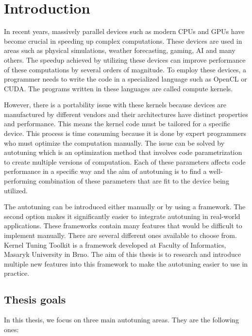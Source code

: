 \documentclass[
  digital,     %
  oneside,     %
  nosansbold,  %
  nocolorbold, %
  lof,         %
  lot,         %
  nocover
]{fithesis4}
\begin{document}
\chapter{Introduction}
In recent years, massively parallel devices such as modern CPUs and GPUs have become crucial in speeding up complex computations. These devices are used in areas such as physical simulations, weather forecasting, gaming, AI and many others. The speedup achieved by utilizing these devices can improve performance of these computations by several orders of magnitude. To employ these devices, a programmer needs to write the code in a specialized language such as OpenCL or CUDA. The programs written in these languages are called compute kernels.

However, there is a portability issue with these kernels because devices are manufactured by different vendors and their architectures have distinct properties and performance. This means the kernel code must be tailored for a specific device. This process is time consuming because it is done by expert programmers who must optimize the computation manually. The issue can be solved by autotuning \cite{balaprakash2018autotuning} which is an optimization method that involves code parametrization to create multiple versions of computation. Each of these parameters affects code performance in a specific way and the aim of autotuning is to find a well-performing combination of these parameters that are fit to the device being utilized.

The autotuning can be introduced either manually or by using a framework. The second option makes it significantly easier to integrate autotuning in real-world applications. These frameworks contain many features that would be difficult to implement manually. There are several different ones available to choose from. Kernel Tuning Toolkit is a framework developed at Faculty of Informatics, Masaryk University in Brno. The aim of this thesis is to research and introduce multiple new features into this framework to make the autotuning easier to use in practice.

\section{Thesis goals}
In this thesis, we focus on three main autotuning areas. They are the following ones:
\end{document}
